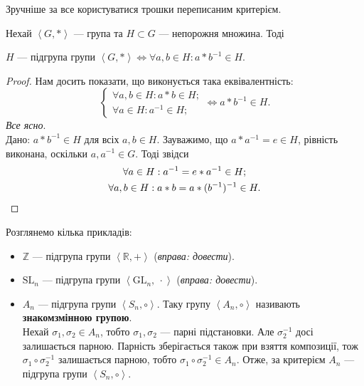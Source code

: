 \documentclass{math_library}
\begin{document}

Зручніше за все користуватися трошки переписаним критерієм.

\begin{corollary}
Нехай $\left<G,* \right>$ --- група та $H \subset G$ --- непорожня множина. Тоді
\begin{center}
$H$ --- підгрупа групи $\left<G,*\right> \iff \forall a,b \in H: a*b^{-1} \in H$.
\end{center}
\end{corollary}

\begin{proof}
Нам досить показати, що виконується така еквівалентність:
\[
\begin{cases} \forall a,b \in H: a*b \in H; \\ \forall a \in H: a^{-1} \in H; \end{cases} \iff a*b^{-1} \in H.
\]
\rightproof \textit{Все ясно}.\\
\leftproof Дано: $a*b^{-1} \in H$ для всіх $a,b \in H$. Зауважимо, що $a*a^{-1} = e \in H$, рівність виконана, оскільки $a,a^{-1} \in G$. Тоді звідси
\begin{gather*}
\forall a \in H: a^{-1} = e*a^{-1} \in H; \\
\forall a,b \in H: a*b = a*(b^{-1})^{-1} \in H.		\qedhere
\end{gather*}
\end{proof}

\begin{example}
Розглянемо кілька прикладів:
\begin{itemize}
\item $\mathbb{Z}$ --- підгрупа групи $\left<\mathbb{R},+ \right>$ (\textit{вправа: довести}).
\item $\mathrm{SL}_n$  --- підгрупа групи $\left<\mathrm{GL}_n,\ \cdot \right>$ (\textit{вправа: довести}).
\item $A_n$ --- підгрупа групи $\left<S_n, \circ\right>$. Таку групу $\left<A_n, \circ\right>$ називають \textbf{знакомзмінною групою}.
\bigskip \\
Нехай $\sigma_1, \sigma_2 \in A_n$, тобто $\sigma_1, \sigma_2$ --- парні підстановки. Але $\sigma_2^{-1}$ досі залишається парною. Парність зберігається також при взяття композиції, тож $\sigma_1 \circ \sigma_2^{-1}$ залишається парною, тобто $\sigma_1 \circ \sigma_2^{-1} \in A_n$. Отже, за критерієм $A_n$ --- підгрупа групи $\left<S_n, \circ \right>$.
\end{itemize}
\end{example}
\end{document}
